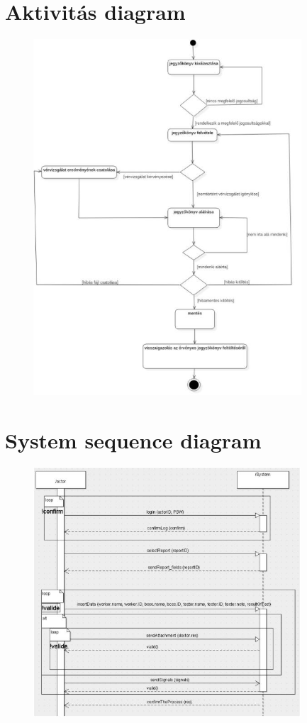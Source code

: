 \newpage
\section{Aktivitás diagram}

\begin{figure}[!h]
	\centering
	\includegraphics[width=100mm, keepaspectratio]{figures/aktivitas.jpg}
\end{figure}
\newpage
\section{System sequence diagram}

\begin{figure}[!h]
	\centering
	\includegraphics[width=100mm, keepaspectratio]{figures/ssd1.jpg}
\end{figure}

